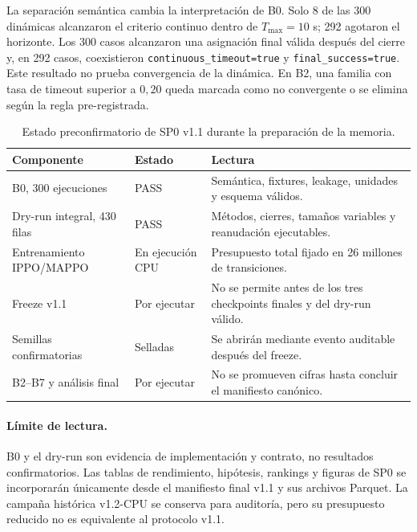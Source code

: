 La separación semántica cambia la interpretación de B0. Solo 8 de las 300 dinámicas alcanzaron el criterio continuo dentro de $T_{\max}=10$ s; 292 agotaron el horizonte. Los 300 casos alcanzaron una asignación final válida después del cierre y, en 292 casos, coexistieron \texttt{continuous\_timeout=true} y \texttt{final\_success=true}. Este resultado no prueba convergencia de la dinámica. En B2, una familia con tasa de timeout superior a $0{,}20$ queda marcada como no convergente o se elimina según la regla pre-registrada.

\begin{table}[H]
\centering
\footnotesize
\begin{tabularx}{\textwidth}{@{}p{}p{}X@{}}
\toprule
Componente & Estado & Lectura \\
\midrule
B0, 300 ejecuciones & PASS & Semántica, fixtures, leakage, unidades y esquema válidos. \\
Dry-run integral, 430 filas & PASS & Métodos, cierres, tamaños variables y reanudación ejecutables. \\
Entrenamiento IPPO/MAPPO & En ejecución CPU & Presupuesto total fijado en 26 millones de transiciones. \\
Freeze v1.1 & Por ejecutar & No se permite antes de los tres checkpoints finales y del dry-run válido. \\
Semillas confirmatorias & Selladas & Se abrirán mediante evento auditable después del freeze. \\
B2--B7 y análisis final & Por ejecutar & No se promueven cifras hasta concluir el manifiesto canónico. \\
\bottomrule
\end{tabularx}
\caption{Estado preconfirmatorio de SP0 v1.1 durante la preparación de la memoria.}
\label{tab:sp0-estado-v11}
\end{table}

\paragraph{Límite de lectura.}
B0 y el dry-run son evidencia de implementación y contrato, no resultados confirmatorios. Las tablas de rendimiento, hipótesis, rankings y figuras de SP0 se incorporarán únicamente desde el manifiesto final v1.1 y sus archivos Parquet. La campaña histórica v1.2-CPU se conserva para auditoría, pero su presupuesto reducido no es equivalente al protocolo v1.1.
